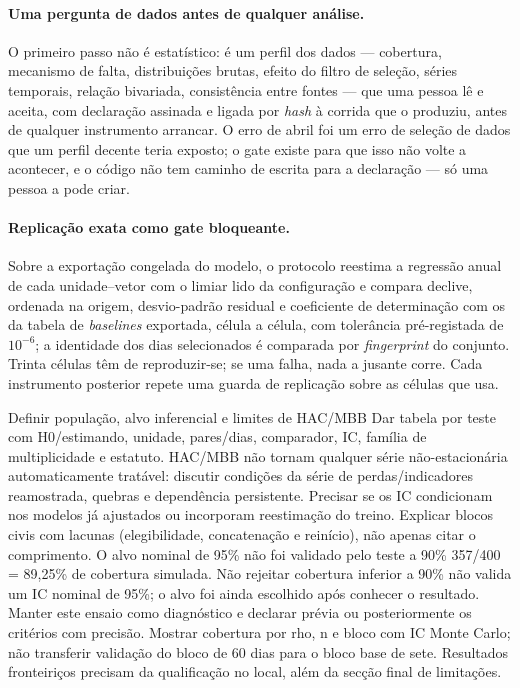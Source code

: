 \paragraph{Uma pergunta de dados antes de qualquer análise.} O primeiro
passo não é estatístico: é um perfil dos dados --- cobertura, mecanismo de
falta, distribuições brutas, efeito do filtro de seleção, séries temporais,
relação bivariada, consistência entre fontes --- que uma pessoa lê e
aceita, com declaração assinada e ligada por \emph{hash} à corrida que o
produziu, antes de qualquer instrumento arrancar. O erro de abril foi um
erro de seleção de dados que um perfil decente teria exposto; o gate
existe para que isso não volte a acontecer, e o código não tem caminho de
escrita para a declaração --- só uma pessoa a pode criar.

\paragraph{Replicação exata como gate bloqueante.} Sobre a exportação
congelada do modelo, o protocolo reestima a regressão anual de cada
unidade--vetor com o limiar lido da configuração e compara declive,
ordenada na origem, desvio-padrão residual e coeficiente de determinação
com os da tabela de \emph{baselines} exportada, célula a célula, com
tolerância pré-registada de $10^{-6}$; a identidade dos dias selecionados
é comparada por \emph{fingerprint} do conjunto. Trinta células têm de
reproduzir-se; se uma falha, nada a jusante corre. Cada instrumento
posterior repete uma guarda de replicação sobre as células que usa.

{Definir população, alvo inferencial e limites de HAC/MBB}
{Dar tabela por teste com H0/estimando, unidade, pares/dias, comparador,
IC, família de multiplicidade e estatuto. HAC/MBB não tornam qualquer
série não-estacionária automaticamente tratável: discutir condições da
série de perdas/indicadores reamostrada, quebras e dependência persistente.
Precisar se os IC condicionam nos modelos já ajustados ou incorporam
reestimação do treino. Explicar blocos civis com lacunas (elegibilidade,
concatenação e reinício), não apenas citar o comprimento.}%
{O alvo nominal de 95\% não foi validado pelo teste a 90\%}
{357/400 = 89,25\% de cobertura simulada. Não rejeitar cobertura inferior
a 90\% não valida um IC nominal de 95\%; o alvo foi ainda escolhido após
conhecer o resultado. Manter este ensaio como diagnóstico e declarar
prévia ou posteriormente os critérios com precisão. Mostrar cobertura
por rho, n e bloco com IC Monte Carlo; não transferir validação do bloco
de 60 dias para o bloco base de sete. Resultados fronteiriços precisam
da qualificação no local, além da secção final de limitações.}%
